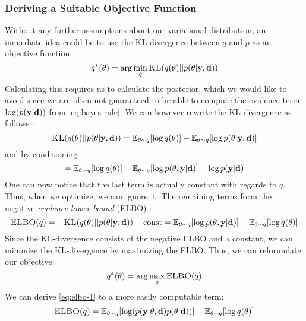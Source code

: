 \subsubsection{Deriving a Suitable Objective Function}
Without any further assumptions about our variational distribution, an immediate idea could be to use the KL-divergence between $q$ and $p$ as an objective function:
\begin{equation}\label{eq:kld}q^*(\theta) = \arg \min_{q} \textsc{KL}(q(\theta) || p(\theta | \mathbf{y}, \mathbf{d}))\end{equation}
Calculating this requires us to calculate the posterior, which we would like to avoid since we are often not guaranteed to be able to compute the evidence term $\log(p(\mathbf{y} | \mathbf{d}))$ from \eqref{eq:bayes-rule}.
We can however rewrite the KL-divergence as follows \cite{blei17}:
\begin{equation}\textsc{KL}(q(\theta)|| p(\theta| \mathbf{y}, \mathbf{d})) = \mathbb{E}_{\theta \sim q}[\log q(\theta)] - \mathbb{E}_{\theta \sim q}[\log p(\theta|\mathbf{y}, \mathbf{d})]\end{equation}
and by conditioning
\begin{equation}\label{eq:kld-2}= \mathbb{E}_{\theta \sim q}[\log q(\theta)] - \mathbb{E}_{\theta \sim q}[\log p(\theta, \mathbf{y}| \mathbf{d})] - \log p(\mathbf{y}| \mathbf{d})\end{equation}
One can now notice that the last term is actually constant with regards to $q$.
Thus, when we optimize, we can ignore it. The remaining terms form the negative \textit{evidence lower bound} (ELBO) \cite{blei17}:
\begin{equation}\label{eq:elbo-1}\textsc{ELBO}(q)= -\textsc{KL}(q(\theta) || p(\theta | \mathbf{y}, \mathbf{d})) + \textrm{const}= \mathbb{E}_{\theta \sim q}[\log p(\theta, \mathbf{y}| \mathbf{d})]-\mathbb{E}_{\theta \sim q}[\log q(\theta)]\end{equation}
Since the KL-divergence consists of the negative ELBO and a constant, we can minimize the KL-divergence by maximizing the ELBO. Thus, we can reformulate our objective:
\begin{equation}\label{eq:elbo-objective}q^*(\theta) = \arg \max_{q} \textsc{ELBO}(q)\end{equation}
We can derive \eqref{eq:elbo-1} to a more easily computable term:
\begin{equation}\label{eq:elbo-2}\textsc{ELBO}(q) = \mathbb{E}_{\theta \sim q}[\log (p(\mathbf{y}| \theta , \mathbf{d})p(\theta | \mathbf{d}))] - \mathbb{E}_{\theta \sim q}[\log q(\theta)]\end{equation}
